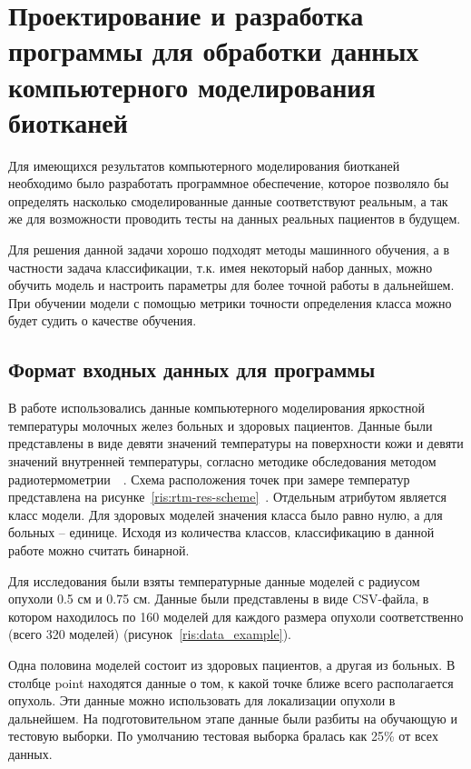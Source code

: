 \newpage
\section{\Large Проектирование и разработка программы для обработки данных компьютерного моделирования биотканей}
Для имеющихся результатов компьютерного моделирования биотканей необходимо было разработать программное обеспечение, которое позволяло бы определять насколько смоделированные данные соответствуют реальным, а так же для возможности проводить тесты на данных реальных пациентов в будущем.
\par
Для решения данной задачи хорошо подходят методы машинного обучения, а в частности задача классификации, т.к. имея некоторый набор данных, можно обучить модель и настроить параметры для более точной работы в дальнейшем. При обучении модели с помощью метрики точности определения класса можно будет судить о качестве обучения.

\subsection{Формат входных данных для программы}
В работе использовались данные компьютерного моделирования яркостной температуры молочных желез больных и здоровых пациентов. Данные были представлены в виде девяти значений температуры на поверхности кожи и девяти значений внутренней температуры, согласно методике обследования методом радиотермометрии~\cite{fear2000}~\cite{bardati}. Схема расположения точек при замере температур представлена на рисунке~\ref{ris:rtm-res-scheme}~\cite{vesninSovMicrowave}. Отдельным атрибутом является класс модели. Для здоровых моделей значения класса было равно нулю, а для больных -- единице. Исходя из количества классов, классификацию в данной работе можно считать бинарной.
\\
\par
Для исследования были взяты температурные данные моделей с радиусом опухоли 0.5 см и 0.75 см. Данные были представлены в виде CSV-файла, в котором находилось по 160 моделей для каждого размера опухоли соответственно (всего 320 моделей) (рисунок~\ref{ris:data_example}).
\\
\par
Одна половина моделей состоит из здоровых пациентов, а другая из больных. В столбце point находятся данные о том, к какой точке ближе всего располагается опухоль. Эти данные можно использовать для локализации опухоли в дальнейшем. На подготовительном этапе данные были разбиты на обучающую и тестовую выборки. По умолчанию тестовая выборка бралась как 25\% от всех данных.

